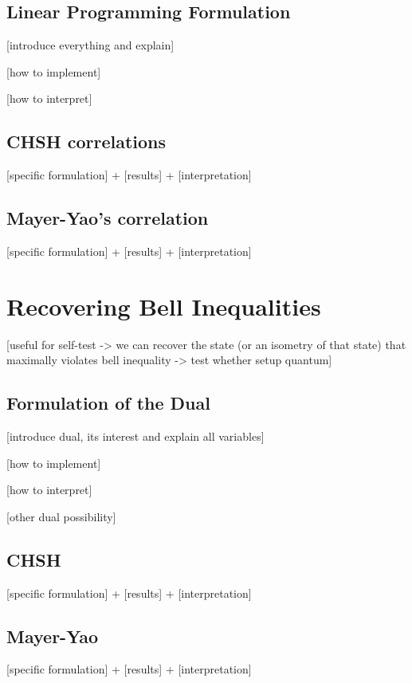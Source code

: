 \subsection{Linear Programming Formulation}

[introduce everything and explain]

[how to implement]

[how to interpret]

\subsection{CHSH correlations}

[specific formulation] + [results] + [interpretation]

\subsection{Mayer-Yao’s correlation}

[specific formulation] + [results] + [interpretation]


\section{Recovering Bell Inequalities}

[useful for self-test -> we can recover the state (or an isometry of that state) that maximally violates bell inequality -> test whether setup quantum]

\subsection{Formulation of the Dual}

[introduce dual, its interest and explain all variables]

[how to implement]

[how to interpret]

[other dual possibility]

\subsection{CHSH}

[specific formulation] + [results] + [interpretation]

\subsection{Mayer-Yao}

[specific formulation] + [results] + [interpretation]

